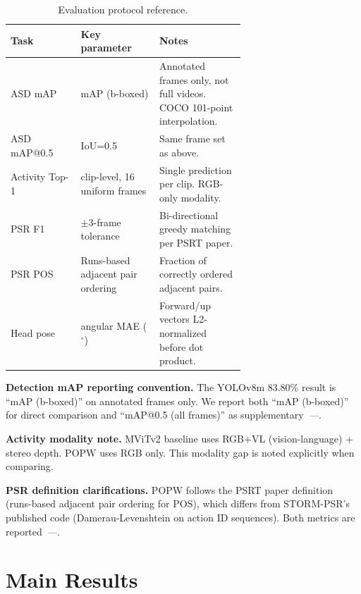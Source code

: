 \documentclass[10pt,journal,compsoc]{IEEEtran}
\newcommand{\popw}{POPW}
\newcommand{\todo}{\textit{---}}
\newcommand{\popwres}{\todo}
\begin{document}
\begin{table}[htbp]
\centering
\small
\caption{Evaluation protocol reference.}
\label{tab:protocol}
\begin{tabular}{p{0.22\linewidth}p{0.22\linewidth}p{0.22\linewidth}}
\toprule
\textbf{Task} & \textbf{Key parameter} & \textbf{Notes} \\
\midrule
ASD mAP & mAP (b-boxed) & Annotated frames only, not full videos. COCO 101-point interpolation. \\
ASD mAP@0.5 & IoU=0.5 & Same frame set as above. \\
Activity Top-1 & clip-level, 16 uniform frames & Single prediction per clip. RGB-only modality. \\
PSR F1 & $\pm3$-frame tolerance & Bi-directional greedy matching per PSRT paper. \\
PSR POS & Runs-based adjacent pair ordering & Fraction of correctly ordered adjacent pairs. \\
Head pose & angular MAE ($^\circ$) & Forward/up vectors L2-normalized before dot product. \\
\bottomrule
\end{tabular}
\end{table}

\noindent\textbf{Detection mAP reporting convention.} The YOLOv8m 83.80\% result is ``mAP (b-boxed)'' on annotated frames only. We report both ``mAP (b-boxed)'' for direct comparison and ``mAP@0.5 (all frames)'' as supplementary~\popwres.

\noindent\textbf{Activity modality note.} MViTv2 baseline uses RGB+VL (vision-language) + stereo depth. \popw{} uses RGB only. This modality gap is noted explicitly when comparing.

\noindent\textbf{PSR definition clarifications.} POPW follows the PSRT paper definition (runs-based adjacent pair ordering for POS), which differs from STORM-PSR's published code (Damerau-Levenshtein on action ID sequences). Both metrics are reported~\popwres.

\FloatBarrier

\section{Main Results}
\label{sec:main-results}
\end{document}
